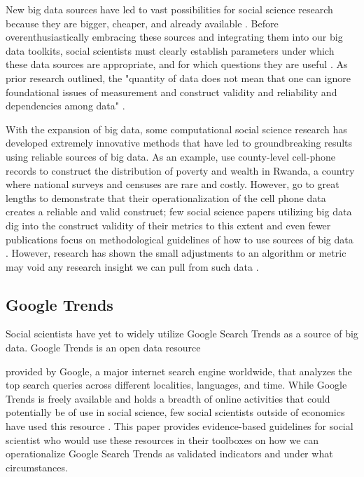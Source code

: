 
New big data sources have led to vast possibilities for social science
research because they are bigger, cheaper, and already available
\citep{kingEnsuringDataRichFuture2011,lazerComputationalSocialScience2009,salganikBitBitSocial2017}.
Before overenthusiastically embracing these
sources and integrating them into our big data toolkits, social scientists must clearly establish
parameters under which these data sources are appropriate, 
and for which questions they are useful 
\citep{bailCulturalEnvironmentMeasuring2014, lazerParableGoogleFlu2014}. As
prior research outlined, the "quantity of data does not mean that one
can ignore foundational issues of measurement and construct validity and
reliability and dependencies among data" 
\citep[p. 1203]{lazerParableGoogleFlu2014}. 

With the expansion of big data, some computational social science research has
developed extremely innovative methods that have led to groundbreaking results using 
reliable sources of big data. As an example,\citet{blumenstockPredictingPovertyWealth2015}
use county-level cell-phone records to construct the distribution of poverty
and wealth in Rwanda, a country where national surveys and censuses are
rare and costly. However, \citet{blumenstockPredictingPovertyWealth2015} go to
great lengths to demonstrate that their operationalization of the cell
phone data creates a reliable and valid construct; few social science
papers utilizing big data dig into the construct validity of their
metrics to this extent and even fewer publications focus on
methodological guidelines of how to use sources of big data
\citep[For exceptions, see ][]{asseoTrackingCOVID19Using2020, stilesAssessingCriterionValidity2018}.
However, research has shown the small adjustments to an algorithm or
metric may void any research insight we can pull from such data
\citep{lazerParableGoogleFlu2014}.

\subsection{Google Trends}

Social scientists have yet to widely utilize Google Search Trends as a source of big data.
Google Trends is an open data resource

provided by Google, a major internet search
engine worldwide, that analyzes the top search queries across different localities, 
languages, and time. While Google Trends is freely available and holds a breadth of 
online activities that could potentially be of use in social science, few social 
scientists outside of economics have used this resource \citep[see][for examples]{choi2012predicting, jun2018ten,da2011search}. This paper provides evidence-based guidelines for social scientist who would use these resources in their toolboxes on how we can operationalize 
Google Search Trends
as validated indicators and under what circumstances.

